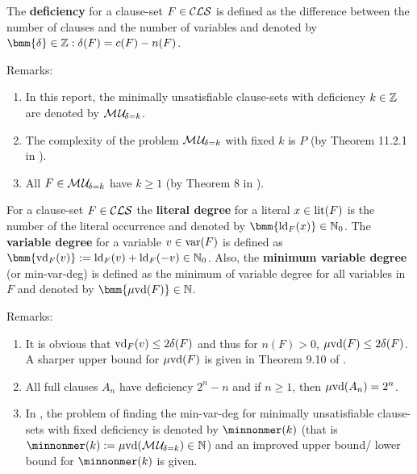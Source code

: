 \documentclass{report}
\begin{document}
\begin{defi}\label{def:deficiency}
The \textbf{deficiency} for a clause-set $F \in \mathcal{CLS}$ is defined as the difference between the number of clauses and the number of variables and denoted by $\bmm{\delta} \in \ZZ: \delta(F)= c(F) - n(F)$.
\end{defi}
Remarks:
  \begin{enumerate}
  \item In this report, the minimally unsatisfiable clause-sets with deficiency $k \in \mathbb{Z}$ are denoted by $\mathcal{M\hspace{0.8pt}U}_{\!\delta=k}$.
  \item The complexity of the problem $\mathcal{M\hspace{0.8pt}U}_{\!\delta=k}$ with fixed $k$ is $P$ (by Theorem 11.2.1 in \cite{Kullmann2007HandbuchMU}).
  \item All $F \in \mathcal{M\hspace{0.8pt}U}_{\!\delta=k}$ have $k \ge 1$ (by Theorem 8 in \cite{DDK98}).
  \end{enumerate}

\begin{defi}\label{def:degree}
For a clause-set $F \in \mathcal{CLS}$ the \textbf{literal degree} for a literal $x \in \operatorname{lit}(F)$ is the number of the literal occurrence and denoted by $\bmm{\ldeg_F(x)} \in \NNZ$. The \textbf{variable degree} for a variable $v \in \operatorname{var}(F)$ is defined as $\bmm{\vdeg_F(v)} := \ldeg_F(v) + \ldeg_F(-v) \in \NNZ$. Also, the \textbf{minimum variable degree} (or min-var-deg) is defined as the minimum of variable degree for all variables in $F$ and denoted by $\bmm{\minvdeg(F)} \in \NN$.
\end{defi}
Remarks:
  \begin{enumerate}
  \item It is obvious that $\operatorname{vd}_F(v) \le 2 \delta(F)$ and thus for $n(F) >0$, $\operatorname{\mu\!\operatorname{vd}}(F) \le 2 \delta(F)$. A sharper upper bound for $\operatorname{\mu\!\operatorname{vd}}(F)$ is given in Theorem 9.10 of \cite{KullmannZhao2010Extremal}.
  \item All full clauses $A_n$ have deficiency $2^n - n$ and if $n \ge 1$, then  $\operatorname{\mu\!\operatorname{vd}}(A_n) =2^n$.
  \item In \cite{KullmannZhao2010Extremal}, the problem of finding the min-var-deg for minimally unsatisfiable clause-sets with fixed deficiency is denoted by $\minnonmer(k) $ (that is $\minnonmer(k)  :=  \minvdeg(\Musati{\delta=k}) \in \NN$) and an improved upper bound/ lower bound for $\minnonmer(k) $ is given.
    \end{enumerate}
    
\end{document}
